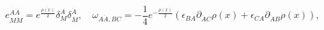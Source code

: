 \begin{equation}
 e_{M \dot M}^{A \dot A} = e^{\frac{\rho(x)}{2}} \delta_M^A
\delta_{\dot M}^{\dot A }, \quad \omega_{A \dot A, BC} = -
\frac{1}{4} e^{- \frac{\rho(x)}{2}} (\epsilon _{BA} \partial
_{\dot A C} \rho(x) + \epsilon _{CA} \partial _{\dot A B}
\rho(x)),
\end{equation}

